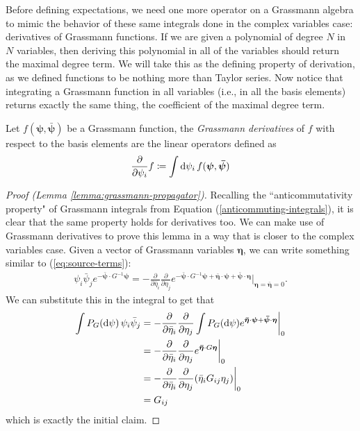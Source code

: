 Before defining expectations, we need one more operator on a Grassmann algebra to mimic the
behavior of these same integrals done in the complex variables case: derivatives of Grassmann
functions. If we are given a polynomial of degree $N$ in $N$ variables, then deriving this
polynomial in all of the variables should return the maximal degree term. We will take this as
the defining property of derivation, as we defined functions to be nothing more than Taylor
series. Now notice that integrating a Grassmann function in all variables (i.e., in all the
basis elements) returns exactly the same thing, the coefficient of the maximal degree term.

\begin{definition}
	Let $f(\boldsymbol{\psi},\boldsymbol{\bar\psi})$ be a Grassmann function, the
	\textit{Grassmann derivatives} of $f$ with respect to the basis elements are the linear
	operators defined as
	\begin{align*}
		\frac{\partial}{\partial\psi_i}f \coloneq \int\mathrm{d}\psi_i\,f(\boldsymbol{\psi},\boldsymbol{\bar\psi})
	\end{align*}
\end{definition}

\begin{proof}[Proof (Lemma \ref{lemma:grassmann-propagator})]
	Recalling the ``anticommutativity property" of Grassmann integrals from Equation (\ref{anticommuting-integrals}),
	it is clear that the same property holds for derivatives too. We can make use of Grassmann
	derivatives to prove this lemma in a way that is closer to the complex variables case.
	Given a vector of Grassmann variables $\boldsymbol{\eta}$, we can write something similar
	to (\ref{eq:source-terms}):
\begin{align*}
	\psi_i\bar\psi_j e^{-\boldsymbol{\bar\psi}\cdot G^{-1} \boldsymbol{\psi}}
		= -\frac{\partial}{\partial\bar\eta_i}\frac{\partial}{\partial\eta_j}
		e^{-\boldsymbol{\bar\psi}\cdot G^{-1} \boldsymbol{\psi}
		+ \boldsymbol{\bar\eta} \cdot \boldsymbol{\psi} + \boldsymbol{\bar\psi}\cdot\boldsymbol{\eta}}
		\bigg|_{\boldsymbol{\eta} = \boldsymbol{\bar\eta} = 0}.
\end{align*}
We can substitute this in the integral to get that
\begin{align*}
	\int P_G(\mathrm{d}\psi)\, \psi_i\bar\psi_j
	&= -\frac{\partial}{\partial\bar\eta_i}\frac{\partial}{\partial\eta_j} \int P_G(\mathrm{d}\psi)
	e^{\boldsymbol{\bar\eta} \cdot \boldsymbol{\psi} + \boldsymbol{\bar\psi}\cdot\boldsymbol{\eta}}
	\bigg|_0 \\
	&= -\frac{\partial}{\partial\bar\eta_i}\frac{\partial}{\partial\eta_j}
	e^{\boldsymbol{\bar\eta} \cdot G \boldsymbol{\eta}} \bigg|_0 \\
	&= -\frac{\partial}{\partial\bar\eta_i}\frac{\partial}{\partial\eta_j}
	(\bar\eta_i G_{ij} \eta_j) \bigg|_0 \\
	&= G_{ij}
\end{align*}
which is exactly the initial claim.
\end{proof}

